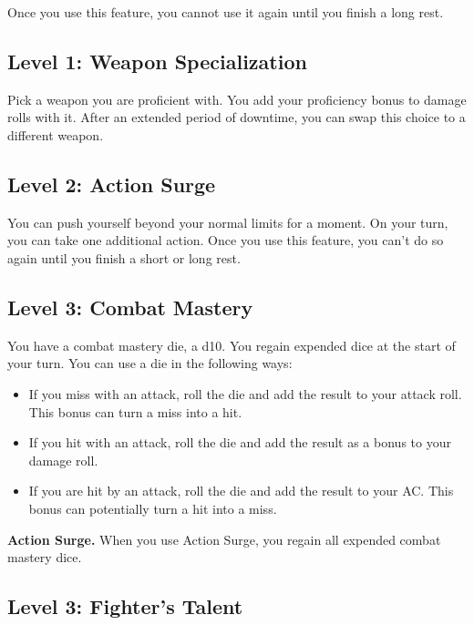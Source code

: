 \documentclass[12pt,letterpaper,twocolumn,openany,nodeprecatedcode,bg=none]{dndbook}
\providecommand{\tightlist}{%
  \setlength{\itemsep}{0pt}\setlength{\parskip}{0pt}}
\begin{document}
Once you use this feature, you cannot use it again until you finish a
long rest.

\subsection{Level 1: Weapon
Specialization}\label{level-1-weapon-specialization}

Pick a weapon you are proficient with. You add your proficiency bonus to
damage rolls with it. After an extended period of downtime, you can swap
this choice to a different weapon.

\subsection{Level 2: Action Surge}\label{level-2-action-surge}

You can push yourself beyond your normal limits for a moment. On your
turn, you can take one additional action. Once you use this feature, you
can't do so again until you finish a short or long rest.

\subsection{Level 3: Combat Mastery}\label{level-3-combat-mastery}

You have a combat mastery die, a d10. You regain expended dice at the
start of your turn. You can use a die in the following ways:

\begin{itemize}
\tightlist
\item
  If you miss with an attack, roll the die and add the result to your
  attack roll. This bonus can turn a miss into a hit.
\item
  If you hit with an attack, roll the die and add the result as a bonus
  to your damage roll.
\item
  If you are hit by an attack, roll the die and add the result to your
  AC. This bonus can potentially turn a hit into a miss.
\end{itemize}

\textbf{Action Surge.} When you use Action Surge, you regain all
expended combat mastery dice.

\subsection{Level 3: Fighter's Talent}\label{level-3-fighters-talent}
\end{document}
